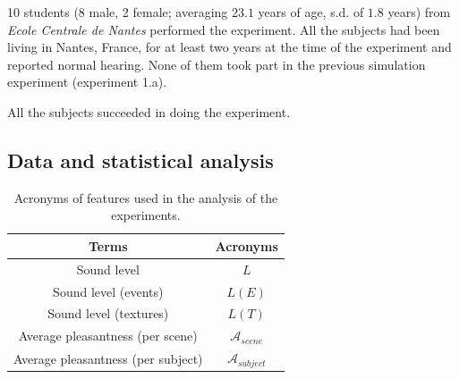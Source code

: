 \documentclass[12pt]{elsarticle}
\newcommand{\cf}{cf.}
\begin{document}
10 students (8 male, 2 female; averaging $23.1$ years of age, s.d. of $1.8$ years) from \emph{Ecole Centrale de Nantes} performed the experiment. All the subjects had been living in Nantes, France, for at least two years at the time of the experiment and reported normal hearing. None of them took part in the previous simulation experiment (experiment 1.a).


All the subjects succeeded in doing the experiment.


\subsection{Data and statistical analysis}
\label{sec:xp1_dataAna}

\begin{table}[t]
\centering
\begin{tabular}{c c}
Terms                              & Acronyms                   \\
\hline
Sound level                        & $L$                        \\
Sound level (events)               & $L(E)$                     \\
Sound level (textures)             & $L(T)$                     \\
Average pleasantness (per scene)   & $\mathcal{A}_{scene}$      \\
Average pleasantness (per subject) & $\mathcal{A}_{subject}$      \\
\hline
\end{tabular}
\vspace{0.5mm}
\caption{Acronyms of features used in the analysis of the experiments.}
\label{tab:acronyme}
\end{table}

\end{document}
